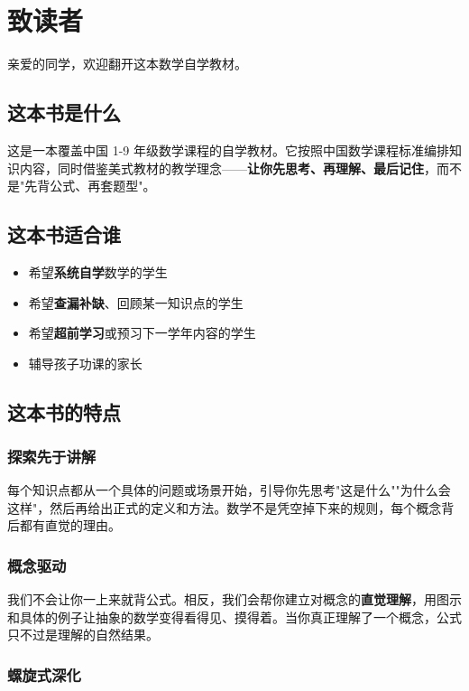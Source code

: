 \chapter*{致读者}


亲爱的同学，欢迎翻开这本数学自学教材。

\section*{这本书是什么}


这是一本覆盖中国 1-9 年级数学课程的自学教材。它按照中国数学课程标准编排知识内容，同时借鉴美式教材的教学理念——\textbf{让你先思考、再理解、最后记住}，而不是"先背公式、再套题型"。

\section*{这本书适合谁}


\begin{itemize}
  \item 希望\textbf{系统自学}数学的学生
  \item 希望\textbf{查漏补缺}、回顾某一知识点的学生
  \item 希望\textbf{超前学习}或预习下一学年内容的学生
  \item 辅导孩子功课的家长
\end{itemize}


\section*{这本书的特点}


\subsection*{探索先于讲解}


每个知识点都从一个具体的问题或场景开始，引导你先思考"这是什么""为什么会这样"，然后再给出正式的定义和方法。数学不是凭空掉下来的规则，每个概念背后都有直觉的理由。

\subsection*{概念驱动}


我们不会让你一上来就背公式。相反，我们会帮你建立对概念的\textbf{直觉理解}，用图示和具体的例子让抽象的数学变得看得见、摸得着。当你真正理解了一个概念，公式只不过是理解的自然结果。

\subsection*{螺旋式深化}


